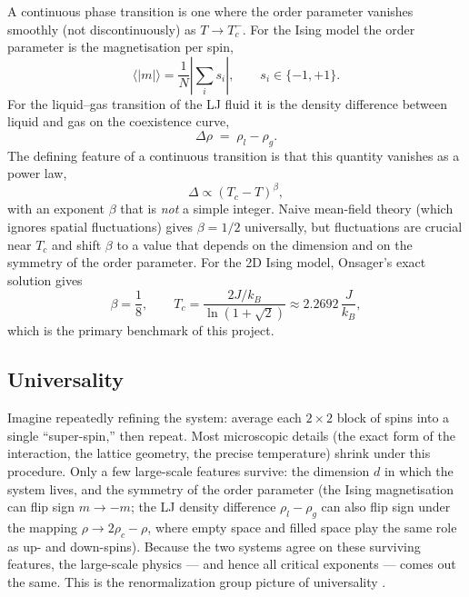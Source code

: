 \documentclass[12pt,a4paper]{article}
\begin{document}
A continuous phase transition is one where the order parameter vanishes smoothly (not
discontinuously) as $T \to T_c^-$. For the Ising model the order parameter is the
magnetisation per spin,
\begin{equation}
  \langle |m| \rangle = \frac{1}{N}\left|\sum_i s_i\right|,
  \qquad s_i \in \{-1,+1\}.
\end{equation}
For the liquid--gas transition of the LJ fluid it is the density difference between
liquid and gas on the coexistence curve,
\begin{equation}
  \Delta\rho \;=\; \rho_l - \rho_g.
\end{equation}
The defining feature of a continuous transition is that this quantity vanishes as a power
law,
\begin{equation}
  \Delta \propto (T_c - T)^\beta,
  \label{eq:beta}
\end{equation}
with an exponent $\beta$ that is \emph{not} a simple integer. Naive mean-field theory
(which ignores spatial fluctuations) gives $\beta = 1/2$ universally, but fluctuations
are crucial near $T_c$ and shift $\beta$ to a value that depends on the dimension and on
the symmetry of the order parameter. For the 2D Ising model, Onsager's exact solution
\cite{onsager} gives
\begin{equation}
  \beta = \frac{1}{8}, \qquad
  T_c = \frac{2J/k_B}{\ln(1+\sqrt{2})} \approx 2.2692\,\frac{J}{k_B},
  \label{eq:onsager}
\end{equation}
which is the primary benchmark of this project.

\subsection{Universality}
\label{sec:universality}

Imagine repeatedly refining the system: average each $2 \times 2$ block of spins
into a single ``super-spin,'' then repeat. Most microscopic details (the exact form of
the interaction, the lattice geometry, the precise temperature) shrink under this
procedure. Only a few large-scale features survive: the dimension $d$ in which the system
lives, and the symmetry of the order parameter (the Ising magnetisation can flip sign
$m \to -m$; the LJ density difference $\rho_l - \rho_g$ can also flip sign under the
mapping $\rho \to 2\rho_c - \rho$, where empty space and filled space play the same role
as up- and down-spins). Because the two systems agree on these surviving features, the
large-scale physics — and hence all critical exponents — comes out the same. This is
the renormalization group picture of universality \cite{goldenfeld}.
\end{document}
